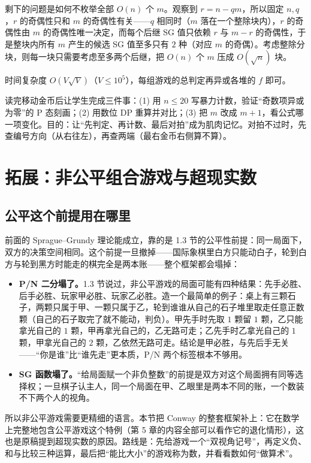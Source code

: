 剩下的问题是如何不枚举全部 $O(n)$ 个 $m$。观察到 $r=n-qm$，所以固定 $n,q$，$r$ 的奇偶性只和 $m$ 的奇偶性有关——$q$ 相同时（$m$ 落在一个整除块内），$r$ 的奇偶性由 $m$ 的奇偶性唯一决定，而每个后继 SG 值只依赖 $r$ 与 $m-r$ 的奇偶性，于是整块内所有 $m$ 产生的候选 SG 值至多只有 $2$ 种（对应 $m$ 的奇偶）。考虑整除分块，则每一块只需要考虑至多两个后继，把 $O(n)$ 个 $m$ 压成 $O(\sqrt n)$ 块。

\cost 时间复杂度 $O(V\sqrt V)$（$V\le10^{5}$），每组游戏的总判定再异或各堆的 $f$ 即可。

\begin{teach}[给学生的实验任务]
读完移动金币后让学生完成三件事：(1) 用 $n\le20$ 写暴力计数，验证“奇数项异或为零”的 P 态刻画；(2) 用数位 DP 重算并对比；(3) 把 $m$ 改成 $m+1$，看公式哪一项变化。目的：让“先判定、再计数、最后对拍”成为肌肉记忆。对拍不过时，先查编号方向（从右往左），再查两端（最右金币右侧算不算）。
\end{teach}
\chapter{拓展：非公平组合游戏与超现实数}
\section{公平这个前提用在哪里}
前面的 Sprague--Grundy 理论能成立，靠的是 1.3 节的公平性前提：同一局面下，双方的决策空间相同。这个前提一旦撤掉——国际象棋里白方只能动白子，轮到白方与轮到黑方时能走的棋完全是两本账——整个框架都会塌掉：
\begin{itemize}
\item \textbf{P/N 二分塌了。}1.3 节说过，非公平游戏的局面可能有四种结果：先手必胜、后手必胜、玩家甲必胜、玩家乙必胜。造一个最简单的例子：桌上有三颗石子，两颗只属于甲、一颗只属于乙，轮到谁谁从自己的石子堆里取走任意正数颗（自己的石子取完了就不能动，判负）。甲先手时先取 $1$ 颗留 $1$ 颗，乙只能拿光自己的 $1$ 颗，甲再拿光自己的，乙无路可走；乙先手时乙拿光自己的 $1$ 颗，甲拿光自己的 $2$ 颗，乙依然无路可走。结论是甲必胜，与先后手无关——“你是谁”比“谁先走”更本质，P/N 两个标签根本不够用。
\item \textbf{SG 函数塌了。}“给局面赋一个非负整数”的前提是双方对这个局面拥有同等选择权；一旦棋子认主人，同一个局面在甲、乙眼里是两本不同的账，一个数装不下两个人的视角。
\end{itemize}
所以非公平游戏需要更精细的语言。本节把 Conway 的整套框架补上：它在数学上完整地包含公平游戏这个特例（第 5 章的内容全部可以看作它的退化情形），这也是原稿提到超现实数的原因。路线是：先给游戏一个“双视角记号”，再定义负、和与比较三种运算，最后把“能比大小”的游戏称为数，并看看数如何“做算术”。

